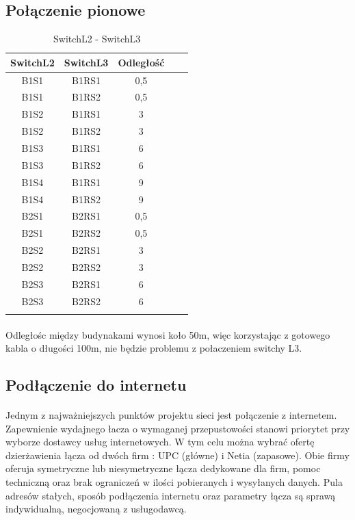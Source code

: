 \subsection{Połączenie pionowe}
\begin{center}
    \begin{longtable}{|c|c|c|c|c|}
    \hline
 	SwitchL2 & SwitchL3 & Odległość \\ \hline
 	B1S1 & B1RS1 & 0,5 \\ \hline
 	B1S1 & B1RS2 & 0,5 \\ \hline
 	B1S2 & B1RS1 & 3 \\ \hline
 	B1S2 & B1RS2 & 3 \\ \hline
 	B1S3 & B1RS1 & 6 \\ \hline
 	B1S3 & B1RS2 & 6 \\ \hline
 	B1S4 & B1RS1 & 9 \\ \hline
 	B1S4 & B1RS2 & 9 \\ \hline
 	B2S1 & B2RS1 & 0,5 \\ \hline
 	B2S1 & B2RS2 & 0,5 \\ \hline 
	B2S2 & B2RS1 & 3 \\ \hline
 	B2S2 & B2RS2 & 3 \\ \hline
 	B2S3 & B2RS1 & 6 \\ \hline
 	B2S3 & B2RS2 & 6 \\ \hline
 	
	\caption{SwitchL2 - SwitchL3}\\
\end{longtable}
\end{center}
\paragraph{}
Odległośc między budynakami wynosi koło 50m, więc korzystając z gotowego kabla o długości 100m, nie będzie problemu z połaczeniem switchy L3.

\subsection{Podłączenie do internetu}
\paragraph{}
Jednym z najważniejszych punktów projektu sieci jest połączenie z internetem. Zapewnienie wydajnego łacza o wymaganej przepustowości stanowi priorytet przy wyborze dostawcy usług internetowych. W tym celu można wybrać ofertę dzierżawienia łącza od dwóch firm : UPC (główne) i Netia (zapasowe). Obie firmy oferuja symetryczne lub niesymetryczne łącza dedykowane dla firm, pomoc techniczną oraz brak ograniczeń w ilości pobieranych i wysyłanych danych. Pula adresów stałych, sposób podłączenia internetu oraz parametry łącza są sprawą indywidualną, negocjowaną z usługodawcą.

